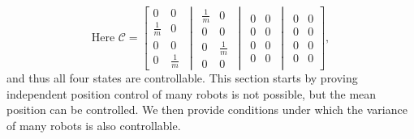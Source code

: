\begin{equation}
\textrm{Here }
\mathcal{C}=\left[
\begin{matrix} 
0 & 0\\
\frac{1}{m} & 0 \\
0 & 0 \\
0 & \frac{1}{m}
\end{matrix}
\,\middle\vert\,
\begin{matrix} 
\frac{1}{m}& 0\\
0 & 0\\
0 & \frac{1}{m}\\
0 & 0
\end{matrix}
\,\middle\vert\,
\begin{matrix} 
0 & 0\\
0 & 0 \\
0 & 0 \\
0 & 0
\end{matrix}
\,\middle\vert\,
\begin{matrix} 
0 & 0\\
0 & 0\\
0 & 0\\
0 & 0
\end{matrix}
 \right],
\end{equation}
and thus all four states are controllable. This section starts by proving independent position control of many robots is not possible, but the mean position can be controlled. We then provide conditions under which the variance of many robots is also controllable.

